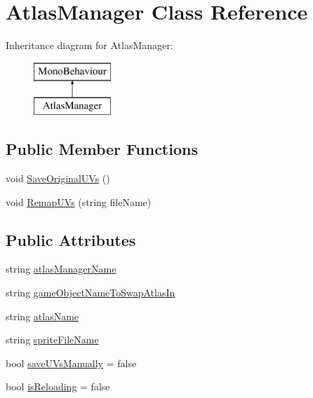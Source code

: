 \hypertarget{class_atlas_manager}{}\section{Atlas\+Manager Class Reference}
\label{class_atlas_manager}
Inheritance diagram for Atlas\+Manager\+:\begin{figure}[H]
\begin{center}
\leavevmode
\includegraphics[height=2.000000cm]{class_atlas_manager}
\end{center}
\end{figure}
\subsection*{Public Member Functions}
\begin{DoxyCompactItemize}
\item 
void \hyperlink{class_atlas_manager_adf52c9bdfa9d2179886b1ce8f32798e9}{Save\+Original\+U\+Vs} ()
\item 
void \hyperlink{class_atlas_manager_aa4011ccc557491ad7cc702f5f3aff893}{Remap\+U\+Vs} (string file\+Name)
\end{DoxyCompactItemize}
\subsection*{Public Attributes}
\begin{DoxyCompactItemize}
\item 
string \hyperlink{class_atlas_manager_ab7501afb67158e43ddfeb7684e003f4d}{atlas\+Manager\+Name}
\item 
string \hyperlink{class_atlas_manager_a9694d5b0e0d64837f2edf83b239c1ebb}{game\+Object\+Name\+To\+Swap\+Atlas\+In}
\item 
string \hyperlink{class_atlas_manager_abfe0df51b5287870b5440a1d9bd95c18}{atlas\+Name}
\item 
string \hyperlink{class_atlas_manager_aeab505443bd56004509c957c6a5f9031}{sprite\+File\+Name}
\item 
bool \hyperlink{class_atlas_manager_af7d6e4efd53d48ccce79e6d89eb44950}{save\+U\+Vs\+Manually} = false
\item 
bool \hyperlink{class_atlas_manager_af2781dfa3f3eff5a3df743360c57d906}{is\+Reloading} = false
\end{DoxyCompactItemize}


